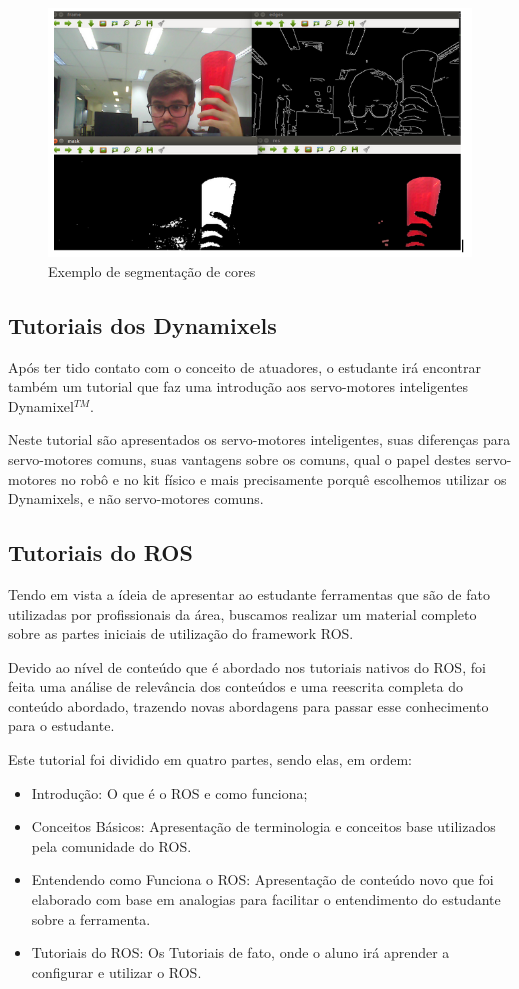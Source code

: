 \begin{figure}[H]
	\centering
	\includegraphics[scale=0.75, angle=0]{Figures/vermelho.png}
	\caption{Exemplo de segmentação de cores}
	\label{fig:vermelho}
\end{figure}

\subsection{Tutoriais dos Dynamixels}
Após ter tido contato com o conceito de atuadores, o estudante irá encontrar também um tutorial que faz uma introdução aos servo-motores inteligentes Dynamixel$^{TM}$.

Neste tutorial são apresentados os servo-motores inteligentes, suas diferenças para servo-motores comuns, suas vantagens sobre os comuns, qual o papel destes servo-motores no robô e no kit físico e mais precisamente porquê escolhemos utilizar os Dynamixels, e não servo-motores comuns. \cite{tutDyna}


\subsection{Tutoriais do ROS}
Tendo em vista a ídeia de apresentar ao estudante ferramentas que são de fato utilizadas por profissionais da área, buscamos realizar um material completo sobre as partes iniciais de utilização do framework ROS.

Devido ao nível de conteúdo que é abordado nos tutoriais nativos do ROS, foi feita uma análise de relevância dos conteúdos e uma reescrita completa do conteúdo abordado, trazendo novas abordagens para passar esse conhecimento para o estudante.

Este tutorial foi dividido em quatro partes, sendo elas, em ordem:
\begin{itemize}
	\item Introdução: O que é o ROS e como funciona;
	\item Conceitos Básicos: Apresentação de terminologia e conceitos base utilizados pela comunidade do ROS.
	\item Entendendo como Funciona o ROS: Apresentação de conteúdo novo que foi elaborado com base em analogias para facilitar o entendimento do estudante sobre a ferramenta.
	\item Tutoriais do ROS: Os Tutoriais de fato, onde o aluno irá aprender a configurar e utilizar o ROS.
\end{itemize}

